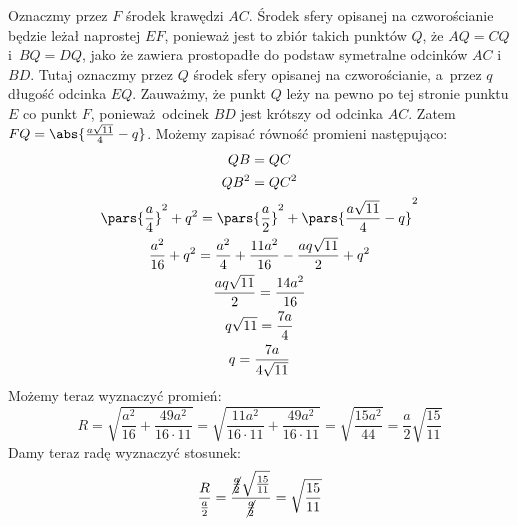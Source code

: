 \noindent
Oznaczmy przez \(F\) środek krawędzi \(AC\). Środek sfery opisanej na czworościanie będzie leżał naprostej \(EF\), ponieważ jest to zbiór takich punktów \(Q\), że \(AQ = CQ\) i~\(BQ = DQ\), jako że zawiera prostopadłe do podstaw symetralne odcinków \(AC\) i~\(BD\). Tutaj oznaczmy przez \(Q\) środek sfery opisanej na czworościanie, a~przez \(q\) długość odcinka \(EQ\). Zauważmy, że punkt \(Q\) leży na pewno po tej stronie punktu \(E\) co punkt \(F\), ponieważ odcinek \(BD\) jest krótszy od odcinka \(AC\). Zatem \(FQ = \abs{\frac{a\sqrt{11}}{4} - q}\). Możemy zapisać równość promieni następująco:
\begin{gather*}
    QB = QC\\
    QB^2 = QC^2\\
    \pars{\frac{a}{4}}^2 + q^2 = \pars{\frac{a}{2}}^2 + \pars{\frac{a\sqrt{11}}{4} - q}^2\\
    \frac{a^2}{16} + q^2 = \frac{a^2}{4} + \frac{11a^2}{16} - \frac{aq\sqrt{11}}{2} + q^2\\
    \frac{aq\sqrt{11}}{2} = \frac{14a^2}{16}\\
    q\sqrt{11} = \frac{7a}{4}\\
    q = \frac{7a}{4\sqrt{11}}
\end{gather*}
Możemy teraz wyznaczyć promień:
\begin{equation*}
    R
    = \sqrt{\frac{a^2}{16} + \frac{49a^2}{16 \cdot 11}}
    = \sqrt{\frac{11a^2}{16 \cdot 11} + \frac{49a^2}{16 \cdot 11}}
    = \sqrt{\frac{15a^2}{44}}
    = \frac{a}{2}\sqrt{\frac{15}{11}}
\end{equation*}
Damy teraz radę wyznaczyć stosunek:
\begin{equation*}
    \frac{R}{\frac{a}{2}}
    = \frac{\cancel{\frac{a}{2}}\sqrt{\frac{15}{11}}}{\cancel{\frac{a}{2}}}
    = \sqrt{\frac{15}{11}}
\end{equation*}
